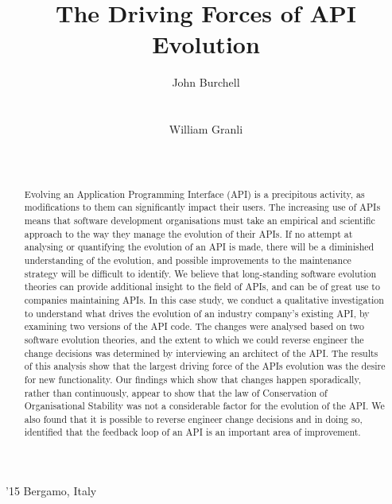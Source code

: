 \documentclass{sig-alternate}
\begin{document}
 {'15 Bergamo, Italy}



\title{The Driving Forces of API Evolution}



\author{
\alignauthor
John Burchell\\
       \\
       \\
\alignauthor
William Granli\\
       \\
       \\
}

\maketitle

\begin{abstract}
Evolving an Application Programming Interface (API) is a precipitous activity, as modifications to them can significantly impact their users. The increasing use of APIs means that software development organisations must take an empirical and scientific approach to the way they manage the evolution of their APIs. 
If no attempt at analysing or quantifying the evolution of an API is made, there will be a diminished understanding of the evolution, and possible improvements to the maintenance strategy will be difficult to identify. We believe that long-standing software evolution theories can provide additional insight to the field of APIs, and can be of great use to companies maintaining APIs. 
In this case study, we conduct a qualitative investigation to understand what drives the evolution of an industry company's existing API, by examining two versions of the API code. The changes were analysed based on two software evolution theories, and the extent to which we could reverse engineer the change decisions was determined by interviewing an architect of the API. 
The results of this analysis show that the largest driving force of the APIs evolution was the desire for new functionality. Our findings which show that changes happen sporadically, rather than continuously, appear to show that the law of Conservation of Organisational Stability was not a considerable factor for the evolution of the API. We also found that it is possible to reverse engineer change decisions and in doing so, identified that the feedback loop of an API is an important area of improvement. 
\end{abstract}
\end{document}

